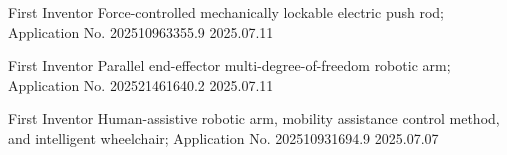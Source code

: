 
\begin{cvhonors}

  \cvhonor
    {First Inventor}
    {Force-controlled mechanically lockable electric push rod; Application No. 202510963355.9}
    {}
    {2025.07.11}

  \cvhonor
    {First Inventor}
    {Parallel end-effector multi-degree-of-freedom robotic arm; Application No. 202521461640.2}
    {}
    {2025.07.11}

  \cvhonor
    {First Inventor}
    {Human-assistive robotic arm, mobility assistance control method, and intelligent wheelchair; Application No. 202510931694.9}
    {}
    {2025.07.07}

\end{cvhonors}
